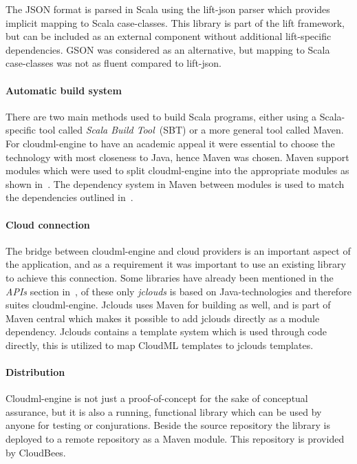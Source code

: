The JSON format is parsed in Scala using the lift-json parser which provides implicit
mapping to Scala case-classes. This library is part of the lift framework,
but can be included as an external component without additional lift-specific dependencies.
GSON was considered as an alternative, but mapping to Scala case-classes was not as 
fluent compared to lift-json.

\paragraph{Automatic build system}
There are two main methods used to build Scala programs, either using a Scala-specific tool called 
\emph{Scala Build Tool}~(SBT) or a more general tool called Maven. 
For cloudml-engine to have an academic appeal it were essential to choose the technology
with most closeness to Java, hence Maven was chosen.
Maven support modules which were used to split cloudml-engine into the appropriate 
modules as shown in~. 
The dependency system in Maven between modules is used to match the dependencies outlined in~.

\paragraph{Cloud connection}
The bridge between cloudml-engine and cloud providers is an important aspect of the application, and as a requirement
it was important to use an existing library to achieve this connection.
Some libraries have already been mentioned in the \emph{APIs} section in~,
of these only \emph{jclouds} is based on Java-technologies and therefore suites cloudml-engine.
Jclouds uses Maven for building as well, and is part of Maven central which makes 
it possible to add jclouds directly as a module dependency.
Jclouds contains a template system which is used through code directly, this is utilized 
to map CloudML templates to jclouds templates.

\paragraph{Distribution}
Cloudml-engine is not just a proof-of-concept for the sake of conceptual assurance, but it is 
also a running, functional library which can be used by anyone for testing or conjurations.
Beside the source repository\cite{cloudml-engine} the library is deployed to a remote repository
\cite{cloudbees-cloudml-engine} as a Maven module.
This repository is provided by CloudBees.

